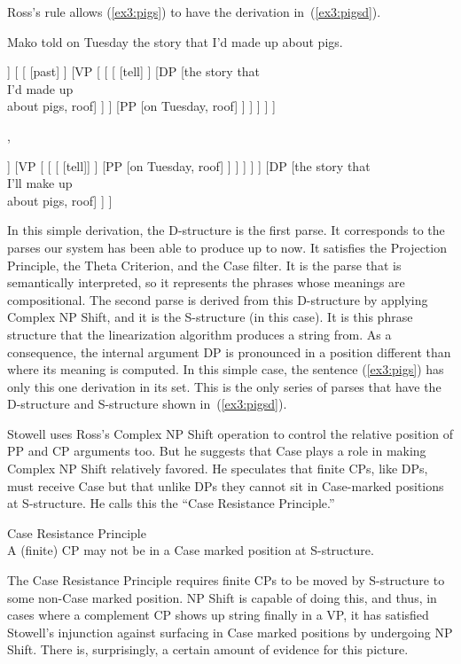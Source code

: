 Ross's rule allows (\ref{ex3:pigs}) to have the derivation in~(\ref{ex3:pigsd}).
\begin{exe}
	\raggedright
	 Mako told on Tuesday the story that I'd made up about pigs.
	\ex \label{ex3:pigsd}
	\small
	\begin{forest}
	[IP
		[DP [Mako, roof]]
		[ 
			[ [past] ]
			[VP [ 
				[ 
					[ [tell] ]
					[DP [the story that\\ I'd made up\\ about pigs, roof] ]
				 ]
				[PP [on Tuesday, roof] ]
			] ]
		]
	]
	\end{forest}
	{\Huge ,}
	\small
	\begin{forest}
	[IP	
		[IP	
			[DP ]
			[\ibar{I} 
				[\obar{I} [past] ]
				[VP [ 
						[ [ [tell]] ]
						[PP [on Tuesday, roof] ]
					 ]
				] ]
		 ]
		[DP [the story that\\I'll make up\\about pigs, roof] ]
	]
	\end{forest}
\end{exe}
In this simple derivation, the D-structure is the first parse. It corresponds to the parses our system has been able to produce up to now. It satisfies the Projection Principle, the Theta Criterion, and the Case filter. It is the parse that is semantically interpreted, so it represents the phrases whose meanings are compositional. The second parse is derived from this D-structure by applying Complex NP Shift, and it is the S-structure (in this case). It is this phrase structure that the linearization algorithm produces a string from. As a consequence, the internal argument DP is pronounced in a position different than where its meaning is computed. In this simple case, the sentence (\ref{ex3:pigs}) has only this one derivation in its set. This is the only series of parses that have the D-structure and S-structure shown in~(\ref{ex3:pigsd}).

Stowell uses Ross's Complex NP Shift operation to control the relative position of PP and CP arguments too. But he suggests that Case plays a role in making Complex NP Shift relatively favored. He speculates that finite CPs, like DPs, must receive Case but that unlike DPs they cannot sit in Case-marked positions at S-structure. He calls this the ``Case Resistance Principle.''
\begin{exe}
\ex \label{ex3:caseresist} Case Resistance Principle\\
A (finite) CP may not be in a Case marked position at S-structure.
\end{exe}
The Case Resistance Principle requires finite CPs to be moved by S-structure to some non-Case marked position. NP Shift is capable of doing this, and thus, in cases where a complement CP shows up string finally in a VP, it has satisfied Stowell's injunction against surfacing in Case marked positions by undergoing NP Shift. There is, surprisingly, a certain amount of evidence for this picture.

